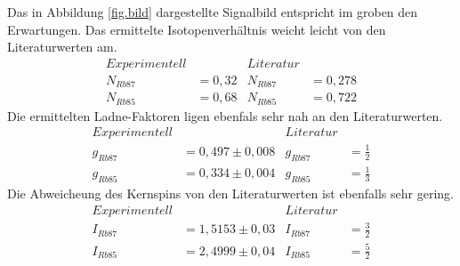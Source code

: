 Das in Abbildung \ref{fig.bild} dargestellte Signalbild entspricht im groben den Erwartungen.
Das ermittelte Isotopenverhältnis weicht leicht von den Literaturwerten am.
\begin{align*}
  Experimentell&&Literatur\\
  N_{Rb87}&=0,32&N_{Rb87}&=0,278\\
  N_{Rb85}&=0,68&N_{Rb85}&=0,722
\end{align*}
Die ermittelten Ladne-Faktoren ligen ebenfals sehr nah an den Literaturwerten.
\begin{align*}
  Experimentell&&Literatur\\
  g_{Rb87} &= 0,497\pm0,008&g_{Rb87} &= \frac{1}{2}\\
  g_{Rb85} &= 0,334\pm0,004&g_{Rb85} &= \frac{1}{3}
\end{align*}
Die Abweicheung des Kernspins von den Literaturwerten ist ebenfalls sehr gering.
\begin{align*}
  Experimentell&&Literatur\\
  I_{Rb87}&=1,5153\pm0,03&I_{Rb87}&=\frac{3}{2}\\
  I_{Rb85}&=2,4999\pm0,04&I_{Rb85}&=\frac{5}{2}
\end{align*}
